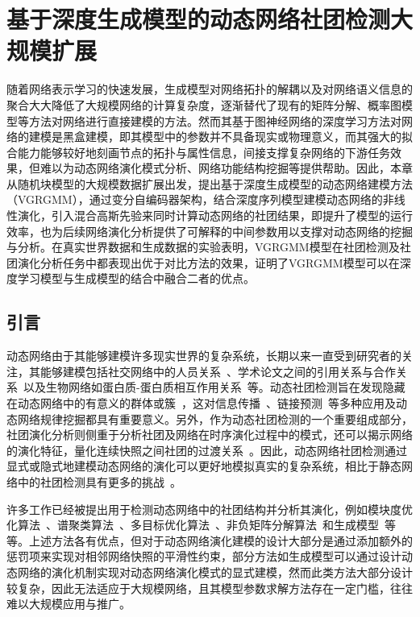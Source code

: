 \baselineskip 20pt


\chapter{基于深度生成模型的动态网络社团检测大规模扩展}
\label{chap:6}

随着网络表示学习的快速发展，生成模型对网络拓扑的解耦以及对网络语义信息的聚合大大降低了大规模网络的计算复杂度，逐渐替代了现有的矩阵分解、概率图模型等方法对网络进行直接建模的方法。然而其基于图神经网络的深度学习方法对网络的建模是黑盒建模，即其模型中的参数并不具备现实或物理意义，而其强大的拟合能力能够较好地刻画节点的拓扑与属性信息，间接支撑复杂网络的下游任务效果，但难以为动态网络演化模式分析、网络功能结构挖掘等提供帮助。因此，本章从随机块模型的大规模数据扩展出发，提出基于深度生成模型的动态网络建模方法（VGRGMM），通过变分自编码器架构，结合深度序列模型建模动态网络的非线性演化，引入混合高斯先验来同时计算动态网络的社团结果，即提升了模型的运行效率，也为后续网络演化分析提供了可解释的中间参数用以支撑对动态网络的挖掘与分析。在真实世界数据和生成数据的实验表明，VGRGMM模型在社团检测及社团演化分析任务中都表现出优于对比方法的效果，证明了VGRGMM模型可以在深度学习模型与生成模型的结合中融合二者的优点。



\section{引言\label{chap6:intro}}


动态网络由于其能够建模许多现实世界的复杂系统，长期以来一直受到研究者的关注，其能够建模包括社交网络中的人员关系~\cite{iacopini2024temporal}、学术论文之间的引用关系与合作关系~\cite{liu2023data,mariani2024collective}以及生物网络如蛋白质-蛋白质相互作用关系~\cite{palla2005uncovering,reed2024tapioca}等。动态社团检测旨在发现隐藏在动态网络中的有意义的群体或簇~\cite{7384503,rossetti2018community}，这对信息传播~\cite{del2016spreading}、链接预测~\cite{lu2015toward,yu2017link,Ma.2019.Ming}等多种应用及动态网络规律挖掘都具有重要意义。另外，作为动态社团检测的一个重要组成部分，社团演化分析则侧重于分析社团及网络在时序演化过程中的模式，还可以揭示网络的演化特征，量化连续快照之间社团的过渡关系~\cite{tang2014detecting}。因此，动态网络社团检测通过显式或隐式地建模动态网络的演化可以更好地模拟真实的复杂系统，相比于静态网络中的社团检测具有更多的挑战~\cite{rossetti2018community}。


许多工作已经被提出用于检测动态网络中的社团结构并分析其演化，例如模块度优化算法~\cite{Mucha.2010.Onnela}、谱聚类算法~\cite{liu2018global}、多目标优化算法~\cite{Zhang.2017.Niu,Zhang.2020.Jin}、非负矩阵分解算法~\cite{Ma.2017.Dong}和生成模型~\cite{pensky2019spectral}等等。上述方法各有优点，但对于动态网络演化建模的设计大部分是通过添加额外的惩罚项来实现对相邻网络快照的平滑性约束，部分方法如生成模型可以通过设计动态网络的演化机制实现对动态网络演化模式的显式建模，然而此类方法大部分设计较复杂，因此无法适应于大规模网络，且其模型参数求解方法存在一定门槛，往往难以大规模应用与推广。


